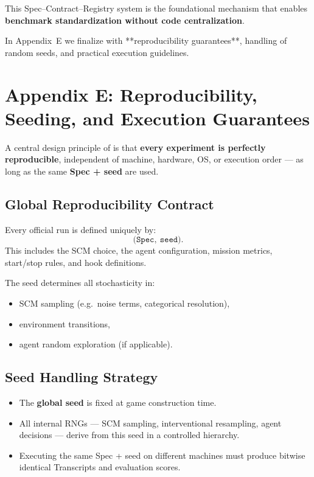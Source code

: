 This Spec–Contract–Registry system is the foundational mechanism that enables \textbf{benchmark standardization without code centralization}.

\bigskip
In Appendix~E we finalize with **reproducibility guarantees**, handling of random seeds, and practical execution guidelines.


\section{Appendix E: Reproducibility, Seeding, and Execution Guarantees}
\label{appendix:reproducibility}

A central design principle of \game is that \textbf{every experiment is perfectly reproducible}, independent of machine, hardware, OS, or execution order — as long as the same \textbf{Spec + seed} are used.

\subsection{Global Reproducibility Contract}
Every official \game run is defined uniquely by:
\[
    \bigl(\texttt{Spec},\ \texttt{seed} \bigr).
\]
This includes the SCM choice, the agent configuration, mission metrics, start/stop rules, and hook definitions.

The seed determines all stochasticity in:
\begin{itemize}
    \item SCM sampling (e.g.\ noise terms, categorical resolution),
    \item environment transitions,
    \item agent random exploration (if applicable).
\end{itemize}

\subsection{Seed Handling Strategy}
\begin{itemize}
    \item The \textbf{global seed} is fixed at game construction time.
    \item All internal RNGs — SCM sampling, interventional resampling, agent decisions — derive from this seed in a controlled hierarchy.
    \item Executing the same Spec + seed on different machines must produce bitwise identical Transcripts and evaluation scores.
\end{itemize}

